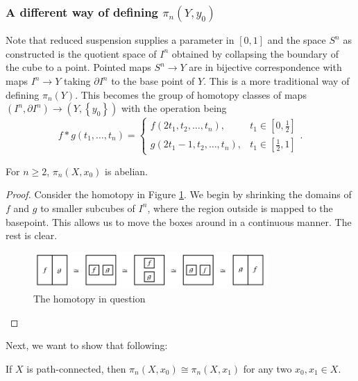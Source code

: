   \subsubsection{A different way of defining
  $\pi_n \left( Y, y_0 \right) $}
  Note that reduced suspension supplies a parameter in
  $\left[ 0,1 \right] $ and the space
  $S^{n}$ as constructed is the quotient space of
  $I^{n}$ obtained by collapsing the boundary of the cube to a
  point.
  Pointed maps $S^{n}\to Y$ are in bijective correspondence
  with maps $I^{n}\to Y$ taking $\partial I^{n}$ to
  the base point of $Y$. This is a more traditional way
  of defining $\pi_n(Y)$. This becomes the group
  of homotopy classes of maps
  $\left( I^{n},\partial I^{n} \right) \to 
  \left( Y, \left\{ y_0 \right\}  \right) $ with the
  operation being
  \[
  f*g \left( t_1, \ldots, t_n \right) =
  \begin{cases}
      f\left( 2t_1, t_2, \ldots, t_n \right) ,& t_1 \in 
      \left[ 0,\frac{1}{2} \right] \\
      g\left( 2t_1-1, t_2, \ldots, t_n \right) ,& t_1 \in 
      \left[ \frac{1}{2},1 \right] 
  \end{cases}.
  \] 

  \begin{proposition}[]
      For $n\ge 2$, $\pi_n\left( X, x_0 \right)$ is abelian.
  \end{proposition}

  \begin{proof}
      Consider the homotopy in Figure \ref{fig:JIDWOOL0290L-png}.
      We begin by shrinking the domains of $f$ and $g$ to smaller
      subcubes of $I^{n}$, where the region outside is
      mapped to the basepoint. This allows us to move the boxes
      around in a continuous manner. The rest is clear.
      \begin{figure}[htpb]
          \centering
          \includegraphics[width=0.8\textwidth]{Figures/JIDWOOL0290L.png}
          \caption{The homotopy in question}
          \label{fig:JIDWOOL0290L-png}
      \end{figure}
  \end{proof}

  Next, we want to show that following:
  \begin{proposition}[]\label{Prop:SwjiaKKDNW1102}
      If $X$ is path-connected, then
      $\pi_n\left( X, x_0 \right) \cong
      \pi_n (X, x_1)$ for any two $x_0,x_1 \in X$.
  \end{proposition}

